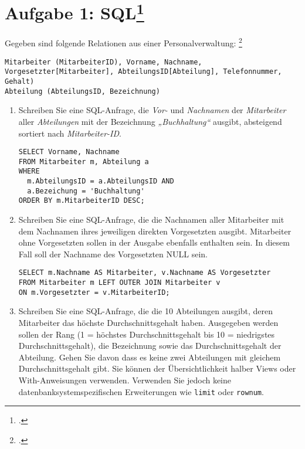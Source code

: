 \documentclass{lehramt-informatik-minimal}
\begin{document}
\section{Aufgabe 1: SQL\footcite{db:pu:3}}

Gegeben sind folgende Relationen aus einer Personalverwaltung:
\footcite[DB/ST - Herbst 2016 (vertieft - 66116), Thema 1, TA1, A4]{examen:66116:2016:09}

\begin{verbatim}
Mitarbeiter (MitarbeiterID), Vorname, Nachname, Vorgesetzter[Mitarbeiter], AbteilungsID[Abteilung], Telefonnummer, Gehalt)
Abteilung (AbteilungsID, Bezeichnung)
\end{verbatim}

\renewcommand{\labelenumi}{(\alph{enumi})}
\begin{enumerate}


\item Schreiben Sie eine SQL-Anfrage, die \emph{Vor-} und
\emph{Nachnamen} der \emph{Mitarbeiter} aller \emph{Abteilungen} mit der
Bezeichnung \emph{„Buchhaltung“} ausgibt, absteigend sortiert nach
\emph{Mitarbeiter-ID}.

\begin{antwort}
\begin{verbatim}
SELECT Vorname, Nachname
FROM Mitarbeiter m, Abteilung a
WHERE
  m.AbteilungsID = a.AbteilungsID AND
  a.Bezeichung = 'Buchhaltung'
ORDER BY m.MitarbeiterID DESC;
\end{verbatim}
\end{antwort}


\item Schreiben Sie eine SQL-Anfrage, die die Nachnamen aller
Mitarbeiter mit dem Nachnamen ihres jeweiligen direkten Vorgesetzten
ausgibt. Mitarbeiter ohne Vorgesetzten sollen in der Ausgabe ebenfalls
enthalten sein. In diesem Fall soll der Nachname des Vorgesetzten NULL
sein.

\begin{antwort}
\begin{verbatim}
SELECT m.Nachname AS Mitarbeiter, v.Nachname AS Vorgesetzter
FROM Mitarbeiter m LEFT OUTER JOIN Mitarbeiter v
ON m.Vorgesetzter = v.MitarbeiterID;
\end{verbatim}
\end{antwort}


\item Schreiben Sie eine SQL-Anfrage, die die 10 Abteilungen ausgibt,
deren Mitarbeiter das höchste Durchschnittsgehalt haben. Ausgegeben
werden sollen der Rang (1 = höchstes Durchschnittsgehalt bis 10 =
niedrigstes Durchschnittsgehalt), die Bezeichnung sowie das
Durchschnittsgehalt der Abteilung. Gehen Sie davon dass es keine zwei
Abteilungen mit gleichem Durchschnittsgehalt gibt. Sie können der
Übersichtlichkeit halber Views oder With-Anweisungen verwenden.
Verwenden Sie jedoch keine datenbanksystemspezifischen Erweiterungen wie
\verb|limit| oder \verb|rownum|.


\end{enumerate}
\end{document}
